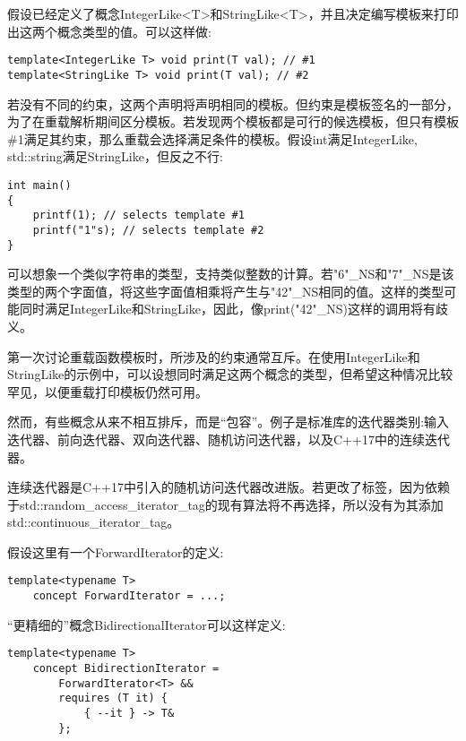 
假设已经定义了概念IntegerLike<T>和StringLike<T>，并且决定编写模板来打印出这两个概念类型的值。可以这样做:

\begin{lstlisting}[style=styleCXX]
template<IntegerLike T> void print(T val); // #1
template<StringLike T> void print(T val); // #2
\end{lstlisting}

若没有不同的约束，这两个声明将声明相同的模板。但约束是模板签名的一部分，为了在重载解析期间区分模板。若发现两个模板都是可行的候选模板，但只有模板\#1满足其约束，那么重载会选择满足条件的模板。假设int满足IntegerLike, std::string满足StringLike，但反之不行:

\begin{lstlisting}[style=styleCXX]
int main()
{
	printf(1); // selects template #1
	printf("1"s); // selects template #2
}
\end{lstlisting}

可以想象一个类似字符串的类型，支持类似整数的计算。若"6"\_NS和"7"\_NS是该类型的两个字面值，将这些字面值相乘将产生与"42"\_NS相同的值。这样的类型可能同时满足IntegerLike和StringLike，因此，像print("42"\_NS)这样的调用将有歧义。


第一次讨论重载函数模板时，所涉及的约束通常互斥。在使用IntegerLike和StringLike的示例中，可以设想同时满足这两个概念的类型，但希望这种情况比较罕见，以便重载打印模板仍然可用。

然而，有些概念从来不相互排斥，而是“包容”。例子是标准库的迭代器类别:输入迭代器、前向迭代器、双向迭代器、随机访问迭代器，以及C++17中的连续迭代器。

\begin{tcolorbox}[colback=webgreen!5!white,colframe=webgreen!75!black]
\hspace*{0.75cm}连续迭代器是C++17中引入的随机访问迭代器改进版。若更改了标签，因为依赖于std::random\_access\_iterator\_tag的现有算法将不再选择，所以没有为其添加std::continuous\_iterator\_tag。
\end{tcolorbox}

假设这里有一个ForwardIterator的定义:

\begin{lstlisting}[style=styleCXX]
template<typename T>
	concept ForwardIterator = ...;
\end{lstlisting}

“更精细的”概念BidirectionalIterator可以这样定义:

\begin{lstlisting}[style=styleCXX]
template<typename T>
	concept BidirectionIterator =
		ForwardIterator<T> &&
		requires (T it) {
			{ --it } -> T&
		};
\end{lstlisting}

